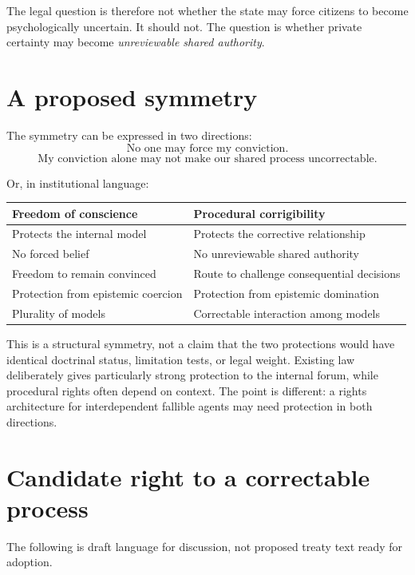 \documentclass[11pt,a4paper]{article}
\begin{document}
The legal question is therefore not whether the state may force citizens to become psychologically uncertain. It should not. The question is whether private certainty may become \emph{unreviewable shared authority}.

\section{A proposed symmetry}

The symmetry can be expressed in two directions:
\[
\boxed{\text{No one may force my conviction.}}
\]
\[
\boxed{\text{My conviction alone may not make our shared process uncorrectable.}}
\]

Or, in institutional language:
\begin{center}
\begin{tabular}{p{}p{}}
\toprule
\textbf{Freedom of conscience} & \textbf{Procedural corrigibility}\\
\midrule
Protects the internal model & Protects the corrective relationship\\
No forced belief & No unreviewable shared authority\\
Freedom to remain convinced & Route to challenge consequential decisions\\
Protection from epistemic coercion & Protection from epistemic domination\\
Plurality of models & Correctable interaction among models\\
\bottomrule
\end{tabular}
\end{center}

This is a structural symmetry, not a claim that the two protections would have identical doctrinal status, limitation tests, or legal weight. Existing law deliberately gives particularly strong protection to the internal forum, while procedural rights often depend on context. The point is different: a rights architecture for interdependent fallible agents may need protection in both directions.

\section{Candidate right to a correctable process}

The following is draft language for discussion, not proposed treaty text ready for adoption.
\end{document}
